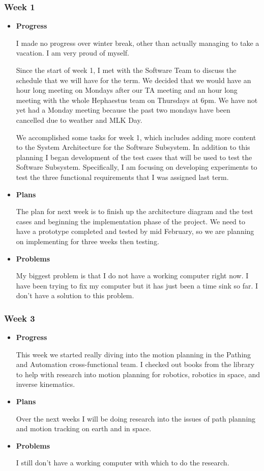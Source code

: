 \subsubsection{Week 1}
\begin{itemize}
\item{
\textbf{Progress}

I made no progress over winter break, other than actually managing to take a vacation. I am very proud of myself.

Since the start of week 1, I met with the Software Team to discuss the schedule that we will have for the term. We decided that we would have an hour long meeting on Mondays after our TA meeting and an hour long meeting with the whole Hephaestus team on Thursdays at 6pm. We have not yet had a Monday meeting because the past two mondays have been cancelled due to weather and MLK Day.

We accomplished some tasks for week 1, which includes adding more content to the System Architecture for the Software Subsystem. In addition to this planning I began development of the test cases that will be used to test the Software Subsystem. Specifically, I am focusing on developing experiments to test the three functional requirements that I was assigned last term. 
}

\item{
\textbf{Plans}

The plan for next week is to finish up the architecture diagram and the test cases and beginning the implementation phase of the project. We need to have a prototype completed and tested by mid February, so we are planning on implementing for three weeks then testing.
}

\item{
\textbf{Problems}

My biggest problem is that I do not have a working computer right now. I have been trying to fix my computer but it has just been a time sink so far. I don't have a solution to this problem.
}
\end{itemize}

\subsubsection{Week 3}
\begin{itemize}
\item{
\textbf{Progress}

This week we started really diving into the motion planning in the Pathing and Automation cross-functional team. I checked out books from the library to help with research into motion planning for robotics, robotics in space, and inverse kinematics.
}
\item{
\textbf{Plans}

Over the next weeks I will be doing research into the issues of path planning and motion tracking on earth and in space.
}
\item{
\textbf{Problems}

I still don't have a working computer with which to do the research.
}
\end{itemize}

